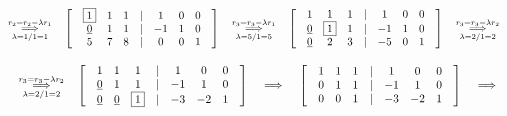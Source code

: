 \documentclass[fleqn]{article}
\begin{document}
\[
\overset{r_2=r_2-\lambda r_1}{\underset{\lambda=1/1=1}{\implies}} \hspace{0.321cm}
\begin{bmatrix}
& \boxed{1} & 1 & 1 & | & 1 & 0 & 0 & \\
& \underline{0} & 1 & 1 & | & -1 & 1 & 0 & \\
& 5 & 7 & 8 & | & 0 & 0 & 1 & 
\end{bmatrix}
\hspace{0.321cm} \overset{r_3=r_3-\lambda r_1}{\underset{\lambda=5/1=5}{\implies}} \hspace{0.321cm}
\begin{bmatrix}
& 1 & 1 & 1 & | & 1 & 0 & 0 & \\
& \underline{0} & \boxed{1} & 1 & | & -1 & 1 & 0 & \\
& \underline{0} & 2 & 3 & | & -5 & 0 & 1 & 
\end{bmatrix}
\hspace{0.321cm} \overset{r_3=r_3-\lambda r_2}{\underset{\lambda=2/1=2}{\implies}} \hspace{0.321cm}
\]

\[
\hspace{0.321cm} \overset{r_3=r_3-\lambda r_2}{\underset{\lambda=2/1=2}{\implies}} \hspace{0.321cm}
\begin{bmatrix}
& 1 & 1 & 1 & | & 1 & 0 & 0 & \\
& \underline{0} & 1 & 1 & | & -1 & 1 & 0 & \\
& \underline{0} & \underline{0} & \boxed{1} & | & -3 & -2 & 1 & 
\end{bmatrix}
\hspace{0.321cm} \implies \hspace{0.321cm}
\begin{bmatrix}
& 1 & 1 & 1 & | & 1 & 0 & 0 & \\
& 0 & 1 & 1 & | & -1 & 1 & 0 & \\
& 0 & 0 & 1 & | & -3 & -2 & 1 & 
\end{bmatrix}
\hspace{0.321cm} \implies \hspace{0.321cm}
\]
\end{document}
